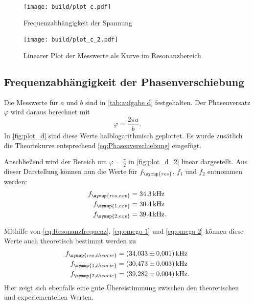\begin{figure} [H]
  \centering
  \texttt{[image: build/plot\_c.pdf]}
  \caption{Frequenzabhängigkeit der Spannung}
  \label{fig:plot_c}
\end{figure}

\begin{figure} [H]
  \centering
  \texttt{[image: build/plot\_c\_2.pdf]}
  \caption{Linearer Plot der Messwerte als Kurve im Resonanzbereich}
  \label{fig:plot_c_2}
\end{figure}

\subsection{Frequenzabhängigkeit der Phasenverschiebung}
\label{sec:Frequenzabhängigkeit der Phasenverschiebung}

Die Messwerte für $a$ und $b$ sind in \autoref{tab:aufgabe d} festgehalten.
Der Phasenversatz $\varphi$ wird daraus berechnet mit
\begin{equation}
  \varphi=\frac{2\pi a}{b}.
\end{equation}
In \autoref{fig:plot_d} sind diese Werte halblogarithmisch geplottet.
Es wurde zusätlich die Theoriekurve entsprechend \eqref{eq:Phasenverschiebung} eingefügt.

Anschließend wird der Bereich um $\varphi=\frac{\pi}{2}$ in \autoref{fig:plot_d_2} linear dargestellt.
Aus dieser Darstellung können nun die Werte für $f_{\symup{res}}$, $f_{1}$ und $f_{2}$ entnommen werden:
\begin{align*}
  f_{\symup{res, exp}} &= 34.3\,\unit{\kilo\hertz} \\
  f_{\symup{1,exp}} &= 30.4\,\unit{\kilo\hertz} \\
  f_{\symup{2,exp}} &= 39.4\,\unit{\kilo\hertz}.
\end{align*}

Mithilfe von \eqref{eq:Resonanzfrequenz}, \eqref{eq:omega 1} und \eqref{eq:omega 2} können diese Werte auch theoretisch bestimmt werden zu
\begin{align*}
  f_{\symup{res, theorie}} &= \qty{34.033+-0.001}{\kilo\hertz} \\
  f_{\symup{1,theorie}} &= \qty{30.473+-0.003}{\kilo\hertz} \\
  f_{\symup{2,theorie}} &= \qty{39.282+-0.004}{\kilo\hertz}.
\end{align*}
Hier zeigt sich ebenfalls eine gute Übereistimmung zwischen den theoretischen und experiementellen Werten.

